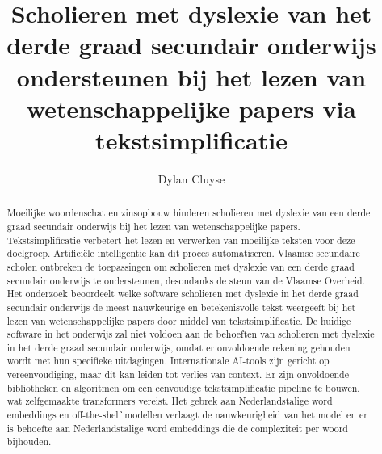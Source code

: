 \documentclass{hogent-article}
\title{Scholieren met dyslexie van het derde graad secundair onderwijs ondersteunen bij het lezen van wetenschappelijke papers via tekstsimplificatie}
\author{Dylan Cluyse}
\begin{document}
\begin{abstract}
Moeilijke woordenschat en zinsopbouw hinderen scholieren met dyslexie van een derde graad secundair onderwijs bij het lezen van wetenschappelijke papers. Tekstsimplificatie verbetert het lezen en verwerken van moeilijke teksten voor deze doelgroep. Artificiële intelligentie kan dit proces automatiseren. Vlaamse secundaire scholen ontbreken de toepassingen om scholieren met dyslexie van een derde graad secundair onderwijs te ondersteunen, desondanks de steun van de Vlaamse Overheid. Het onderzoek beoordeelt welke software scholieren met dyslexie in het derde graad secundair onderwijs de meest nauwkeurige en betekenisvolle tekst weergeeft bij het lezen van wetenschappelijke papers door middel van tekstsimplificatie. De huidige software in het onderwijs zal niet voldoen aan de behoeften van scholieren met dyslexie in het derde graad secundair onderwijs, omdat er onvoldoende rekening gehouden wordt met hun specifieke uitdagingen. Internationale AI-tools zijn gericht op vereenvoudiging, maar dit kan leiden tot verlies van context. Er zijn onvoldoende bibliotheken en algoritmen om een eenvoudige tekstsimplificatie pipeline te bouwen, wat zelfgemaakte transformers vereist. Het gebrek aan Nederlandstalige word embeddings en off-the-shelf modellen verlaagt de nauwkeurigheid van het model en er is behoefte aan Nederlandstalige word embeddings die de complexiteit per woord bijhouden.





\end{abstract}
\end{document}
